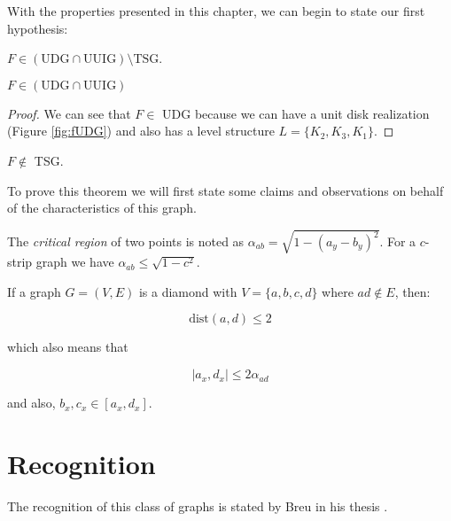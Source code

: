 With the properties presented in this chapter, we can begin to state our first hypothesis:

\begin{hyp}
  $F \in (\text{UDG}\cap\text{UUIG}) \setminus \text{TSG}$.
\end{hyp}

\begin{claim}
 $F \in (\text{UDG}\cap\text{UUIG})$
\end{claim}

\begin{proof}
  We can see that $F \in$ UDG because we can have a unit disk realization (Figure \ref{fig:fUDG}) and also has a level structure $L = \{K_2, K_3, K_1\}$.
\end{proof}

\begin{theorem}
$F \notin$ TSG.
\end{theorem}


To prove this theorem we will first state some claims and observations on behalf of the characteristics of this graph.

\begin{defn}
  The \emph{critical region} of two points is noted as $\alpha_{ab} = \sqrt{1 - (a_y - b_y)^2}$. For a $c$-strip graph we have $\alpha_{ab} \leq \sqrt{1 - c^2}$.
\end{defn}

\begin{obs}
  If a graph $G =(V,E)$ is a diamond with $V = \{a,b,c,d\}$ where $ad \notin E$, then:

  $$\text{dist}(a,d) \leq 2$$

  which also means that

  $$|a_x, d_x| \leq 2\alpha_{ad}$$

  and also, $b_x, c_x \in [a_x, d_x]$.
\end{obs}


\section{Recognition}

The recognition of this class of graphs is stated by Breu in his thesis .
